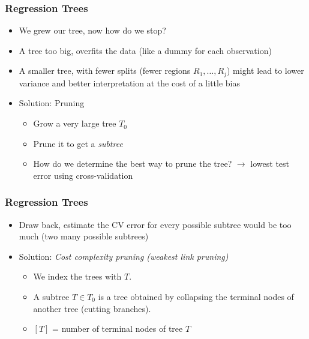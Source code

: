\documentclass[
  shownotes,
  xcolor={svgnames},
  hyperref={colorlinks,citecolor=DarkBlue,linkcolor=DarkRed,urlcolor=DarkBlue}
  , aspectratio=169]{beamer}
\begin{document}
\begin{frame}[fragile]
\frametitle{Regression Trees}
\begin{itemize}
\item We grew our tree, now how do we stop?
\medskip
\item A tree too big, overfits the data (like a dummy for each observation)
\medskip
\item A smaller tree, with fewer splits (fewer regions $R_1,\dots,R_j$) might lead to lower variance and better interpretation at the cost of a little bias
\medskip
\item Solution: Pruning
\begin{itemize}
 \item Grow a very large tree $T_0$
 \item Prune it to get a {\it subtree}
 \item How do we determine the best way to prune the tree? $\rightarrow$ lowest test error using cross-validation
\end{itemize}

\end{itemize}

\end{frame}
\begin{frame}[fragile]
\frametitle{Regression Trees}

\begin{itemize}
\item Draw back, estimate the CV error for every possible subtree would be too much (two many possible subtrees)
\medskip
\item Solution: {\it Cost complexity pruning (weakest link pruning)}
\medskip
\begin{itemize}
    \item We index the trees with $T$.
    \medskip
    \item A subtree $T \in T_0$ is a tree obtained by collapsing the terminal nodes of another tree (cutting branches).
    \medskip
    \item  $[T]$ = number of terminal nodes of tree $T$
\end{itemize}
\end{itemize}
\end{frame}
\end{document}
